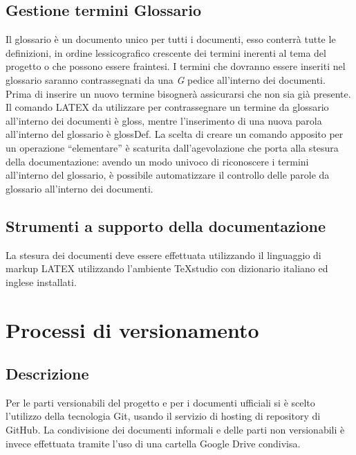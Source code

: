 \documentclass[NormeDiProgetto.tex]{subfiles}
\begin{document}
	\subsection{Gestione termini Glossario}
	Il glossario è un documento unico per tutti i documenti, esso conterrà tutte le definizioni, in ordine lessicografico crescente dei termini inerenti al tema del progetto o che possono essere fraintesi. I termini che dovranno essere inseriti nel glossario saranno contrassegnati da una \textit{G} pedice all’interno dei documenti. \\
	Prima di inserire un nuovo termine bisognerà assicurarsi che non sia già presente. \\
	Il comando LATEX da utilizzare per contrassegnare un termine da glossario all’interno dei documenti è gloss, mentre l’inserimento di una nuova parola all’interno del glossario è glossDef.
	La scelta di creare un comando apposito per un operazione “elementare” è scaturita dall’agevolazione che porta alla stesura della documentazione: avendo un modo univoco di riconoscere i termini all’interno del glossario, è possibile automatizzare il controllo delle parole da glossario all’interno dei documenti.
	
	
	\subsection{Strumenti a supporto della documentazione} %
	La stesura dei documenti deve essere effettuata utilizzando il linguaggio di markup LATEX utilizzando l'ambiente TeXstudio con dizionario italiano ed inglese installati.
	
	
	\section{Processi di versionamento}
	
	\subsection{Descrizione}
	Per le parti versionabili del progetto e per i documenti ufficiali si è scelto l'utilizzo della tecnologia Git, usando il servizio di hosting di repository di GitHub.
	La condivisione dei documenti informali e delle parti non versionabili è invece effettuata tramite l'uso di una cartella Google Drive condivisa.
	
\end{document}
